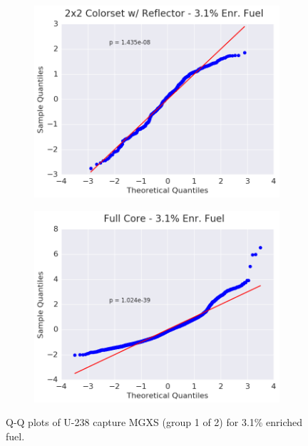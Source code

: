 \begin{figure}[h!]
\begin{subfigure}{0.5\textwidth}
  \includegraphics[width=\linewidth]{figures/patterns/reflector/quantile/31-enr-capt-1}  \caption{}
  \label{fig:chap9-qq-reflector-3.1-capt}
\end{subfigure}%
\begin{subfigure}{0.5\textwidth}
  \centering
  \includegraphics[width=\linewidth]{figures/patterns/full-core/quantile/31-enr-capt-1} \caption{}
  \label{fig:chap9-qq-full-core-3.1-capt}
\end{subfigure}
\caption[Q-Q plots of U-238 capture MGXS for 3.1\% enriched fuel]{\ac{Q-Q} plots of U-238 capture \ac{MGXS} (group 1 of 2) for 3.1\% enriched fuel.}
\label{fig:chap9-qq-3.1-capt}
\end{figure}

